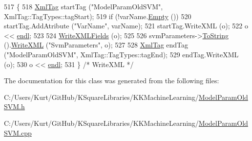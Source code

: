 \begin{DoxyCode}
517 \{
518   \hyperlink{class_k_k_b_1_1_xml_tag}{XmlTag}  startTag (\textcolor{stringliteral}{"ModelParamOldSVM"},  XmlTag::TagTypes::tagStart);
519   \textcolor{keywordflow}{if}  (!varName.\hyperlink{class_k_k_b_1_1_k_k_str_ac69942f73fffd672ec2a6e1c410afdb6}{Empty} ())
520     startTag.AddAtribute (\textcolor{stringliteral}{"VarName"}, varName);
521   startTag.WriteXML (o);
522   o << \hyperlink{namespace_k_k_b_ad1f50f65af6adc8fa9e6f62d007818a8}{endl};
523 
524   \hyperlink{class_k_k_m_l_l_1_1_model_param_a91dc06ec604cf9c2a045991e9b88b5d3}{WriteXMLFields} (o);
525 
526   svmParameters->\hyperlink{class_k_k_m_l_l_1_1_s_v_mparam_a92293ae68a65e26cd73d2c973a2246f0}{ToString} ().\hyperlink{class_k_k_b_1_1_k_k_str_a7de8ac49f70cdcdf2cc31786d23b8a62}{WriteXML} (\textcolor{stringliteral}{"SvmParameters"}, o);
527 
528   \hyperlink{class_k_k_b_1_1_xml_tag}{XmlTag}  endTag (\textcolor{stringliteral}{"ModelParamOldSVM"}, XmlTag::TagTypes::tagEnd);
529   endTag.WriteXML (o);
530   o << \hyperlink{namespace_k_k_b_ad1f50f65af6adc8fa9e6f62d007818a8}{endl};
531 \}  \textcolor{comment}{/* WriteXML */}
\end{DoxyCode}


The documentation for this class was generated from the following files\+:\begin{DoxyCompactItemize}
\item 
C\+:/\+Users/\+Kurt/\+Git\+Hub/\+K\+Square\+Libraries/\+K\+K\+Machine\+Learning/\hyperlink{_model_param_old_s_v_m_8h}{Model\+Param\+Old\+S\+V\+M.\+h}\item 
C\+:/\+Users/\+Kurt/\+Git\+Hub/\+K\+Square\+Libraries/\+K\+K\+Machine\+Learning/\hyperlink{_model_param_old_s_v_m_8cpp}{Model\+Param\+Old\+S\+V\+M.\+cpp}\end{DoxyCompactItemize}
